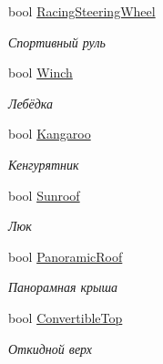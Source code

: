 \begin{DoxyCompactItemize}
bool \hyperlink{class_r_t_1_1_parsing_libs_1_1_models_1_1_automoto_additional_info_ab217e693eb460120b251c48d85662ff4}{Racing\+Steering\+Wheel}
\begin{DoxyCompactList}\small\item\em Спортивный руль \end{DoxyCompactList}\item 
bool \hyperlink{class_r_t_1_1_parsing_libs_1_1_models_1_1_automoto_additional_info_ac00d9173b4fe114883d2a38ee78c8a03}{Winch}
\begin{DoxyCompactList}\small\item\em Лебёдка \end{DoxyCompactList}\item 
bool \hyperlink{class_r_t_1_1_parsing_libs_1_1_models_1_1_automoto_additional_info_a26470f0922bb6ac65cb25f42a0b2a6ab}{Kangaroo}
\begin{DoxyCompactList}\small\item\em Кенгурятник \end{DoxyCompactList}\item 
bool \hyperlink{class_r_t_1_1_parsing_libs_1_1_models_1_1_automoto_additional_info_a4fbcf1a8edaa5e1f969950db837feb0c}{Sunroof}
\begin{DoxyCompactList}\small\item\em Люк \end{DoxyCompactList}\item 
bool \hyperlink{class_r_t_1_1_parsing_libs_1_1_models_1_1_automoto_additional_info_ae619ce61171151bef1c8be02b46f5d54}{Panoramic\+Roof}
\begin{DoxyCompactList}\small\item\em Панорамная крыша \end{DoxyCompactList}\item 
bool \hyperlink{class_r_t_1_1_parsing_libs_1_1_models_1_1_automoto_additional_info_a94f41d6351f7cd57939fae6780d9658f}{Convertible\+Top}
\begin{DoxyCompactList}\small\item\em Откидной верх \end{DoxyCompactList}\item 

\end{DoxyCompactItemize}
